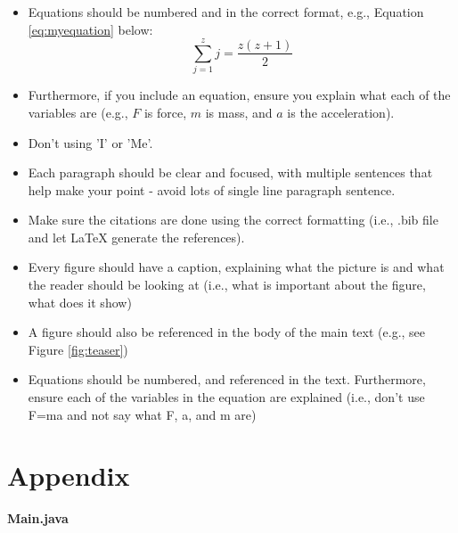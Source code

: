 \documentclass[conference,backref=page]{acmsiggraph}
\begin{document}
\begin{itemize}
\item Equations should be numbered and in the correct format, e.g., Equation \ref{eq:myequation} below:
\begin{equation} \label{eq:myequation}
 \sum_{j=1}^{z} j = \frac{z(z+1)}{2}
\end{equation}
\item Furthermore, if you include an equation, ensure you explain what each of the variables are (e.g., $F$ is force, $m$ is mass, and $a$ is the acceleration).
\item Don't using 'I' or 'Me'.
\item Each paragraph should be clear and focused, with multiple sentences that help make your point - avoid lots of single line paragraph sentence.
\item Make sure the citations are done using the correct formatting (i.e., .bib file and let LaTeX generate the references).
\item Every figure should have a caption, explaining what the picture is and what the reader should be looking at (i.e., what is important about the figure, what does it show)
\item A figure should also be referenced in the body of the main text (e.g., see Figure \ref{fig:teaser})
\item Equations should be numbered, and referenced in the text. Furthermore, ensure each of the variables in the equation are explained (i.e., don't use F=ma and not say what F, a, and m are)
\end{itemize}

\clearpage
\section{Appendix}

\textbf{Main.java}
\end{document}
